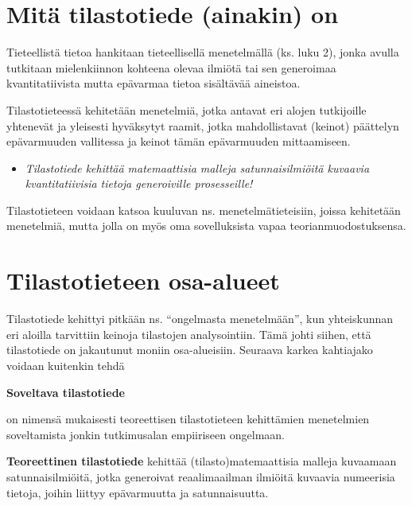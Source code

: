 \documentclass[
]{report}
\providecommand{\tightlist}{%
  \setlength{\itemsep}{0pt}\setlength{\parskip}{0pt}}\usepackage{longtable,booktabs,array}
\begin{document}
\hypertarget{mituxe4-tilastotiede-ainakin-on}{%
\section{Mitä tilastotiede (ainakin)
on}\label{mituxe4-tilastotiede-ainakin-on}}

Tieteellistä tietoa hankitaan tieteellisellä menetelmällä (ks. luku 2),
jonka avulla tutkitaan mielenkiinnon kohteena olevaa ilmiötä tai sen
generoimaa kvantitatiivista mutta epävarmaa tietoa sisältävää aineistoa.

Tilastotieteessä kehitetään menetelmiä, jotka antavat eri alojen
tutkijoille yhtenevät ja yleisesti hyväksytyt raamit, jotka
mahdollistavat (keinot) päättelyn epävarmuuden vallitessa ja keinot
tämän epävarmuuden mittaamiseen.

\begin{itemize}
\tightlist
\item
  \emph{Tilastotiede kehittää matemaattisia malleja satunnaisilmiöitä
  kuvaavia kvantitatiivisia tietoja generoiville prosesseille!}
\end{itemize}

Tilastotieteen voidaan katsoa kuuluvan ns. menetelmätieteisiin, joissa
kehitetään menetelmiä, mutta jolla on myös oma sovelluksista vapaa
teorianmuodostuksensa.

\hypertarget{tilastotieteen-osa-alueet}{%
\section{Tilastotieteen osa-alueet}\label{tilastotieteen-osa-alueet}}

Tilastotiede kehittyi pitkään ns. ``ongelmasta menetelmään'', kun
yhteiskunnan eri aloilla tarvittiin keinoja tilastojen analysointiin.
Tämä johti siihen, että tilastotiede on jakautunut moniin osa-alueisiin.
Seuraava karkea kahtiajako voidaan kuitenkin tehdä

\begin{defblock}{}
\textbf{Soveltava tilastotiede}

on nimensä mukaisesti teoreettisen tilastotieteen kehittämien
menetelmien soveltamista jonkin tutkimusalan empiiriseen ongelmaan.

\end{defblock}

\begin{defblock}{}
\textbf{Teoreettinen tilastotiede} kehittää (tilasto)matemaattisia
malleja kuvaamaan satunnaisilmiöitä, jotka generoivat reaalimaailman
ilmiöitä kuvaavia numeerisia tietoja, joihin liittyy epävarmuutta ja
satunnaisuutta.

\end{defblock}
\end{document}
